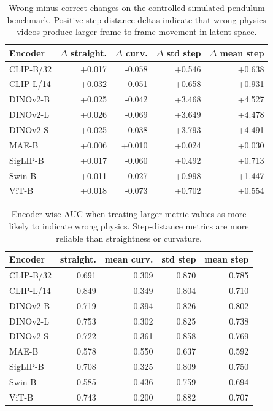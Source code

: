 \begin{table}[t]
\centering
\caption{Wrong-minus-correct changes on the controlled simulated pendulum benchmark. Positive step-distance deltas indicate that wrong-physics videos produce larger frame-to-frame movement in latent space.}
\label{tab:sim-encoder-deltas}
\small
\begin{tabular}{lrrrr}
\toprule
Encoder & $\Delta$ straight. & $\Delta$ curv. & $\Delta$ std step & $\Delta$ mean step \\
\midrule
CLIP-B/32 & +0.017 & -0.058 & +0.546 & +0.638 \\
CLIP-L/14 & +0.032 & -0.051 & +0.658 & +0.931 \\
DINOv2-B & +0.025 & -0.042 & +3.468 & +4.527 \\
DINOv2-L & +0.026 & -0.069 & +3.649 & +4.478 \\
DINOv2-S & +0.025 & -0.038 & +3.793 & +4.491 \\
MAE-B & +0.006 & +0.010 & +0.024 & +0.030 \\
SigLIP-B & +0.017 & -0.060 & +0.492 & +0.713 \\
Swin-B & +0.011 & -0.027 & +0.998 & +1.447 \\
ViT-B & +0.018 & -0.073 & +0.702 & +0.554 \\
\bottomrule
\end{tabular}
\end{table}

\begin{table}[t]
\centering
\caption{Encoder-wise AUC when treating larger metric values as more likely to indicate wrong physics. Step-distance metrics are more reliable than straightness or curvature.}
\label{tab:sim-auc}
\small
\begin{tabular}{lrrrr}
\toprule
Encoder & straight. & mean curv. & std step & mean step \\
\midrule
CLIP-B/32 & 0.691 & 0.309 & 0.870 & 0.785 \\
CLIP-L/14 & 0.849 & 0.349 & 0.804 & 0.710 \\
DINOv2-B & 0.719 & 0.394 & 0.826 & 0.802 \\
DINOv2-L & 0.753 & 0.302 & 0.825 & 0.738 \\
DINOv2-S & 0.722 & 0.361 & 0.858 & 0.769 \\
MAE-B & 0.578 & 0.550 & 0.637 & 0.592 \\
SigLIP-B & 0.708 & 0.325 & 0.809 & 0.750 \\
Swin-B & 0.585 & 0.436 & 0.759 & 0.694 \\
ViT-B & 0.743 & 0.200 & 0.882 & 0.707 \\
\bottomrule
\end{tabular}
\end{table}

